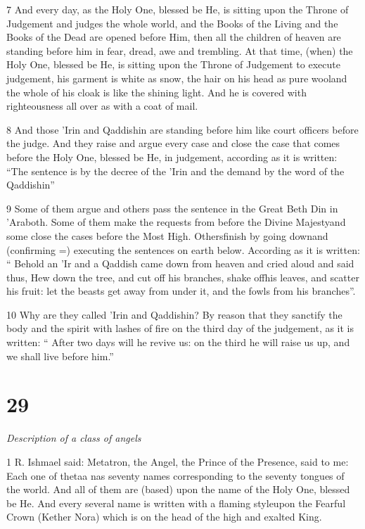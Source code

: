 \par 7 And every day, as the Holy One, blessed be He, is sitting upon the Throne of Judgement and judges the whole world, and the Books of the Living and the Books of the Dead are opened before Him, then all the children of heaven are standing before him in fear, dread, awe and trembling. At that time, (when) the Holy One, blessed be He, is sitting upon the Throne of Judgement to execute judgement, his garment is white as snow, the hair on his head as pure wooland the whole of his cloak is like the shining light. And he is covered with righteousness all over as with a coat of mail. 

\par 8 And those 'Irin and Qaddishin are standing before him like court officers before the judge. And they raise and argue every case and close the case that comes before the Holy One, blessed be He, in judgement, according as it is written: “The sentence is by the decree of the 'Irin and the demand by the word of the Qaddishin”

\par 9 Some of them argue and others pass the sentence in the Great Beth Din in 'Araboth. Some of them make the requests from before the Divine Majestyand some close the cases before the Most High. Othersfinish by going downand (confirming =) executing the sentences on earth below. According as it is written: “ Behold an 'Ir and a Qaddish came down from heaven and cried aloud and said thus, Hew down the tree, and cut off his branches, shake offhis leaves, and scatter his fruit: let the beasts get away from under it, and the fowls from his branches”. 

\par 10 Why are they called 'Irin and Qaddishin? By reason that they sanctify the body and the spirit with lashes of fire on the third day of the judgement, as it is written: “ After two days will he revive us: on the third he will raise us up, and we shall live before him.” 

\chapter{29}

\par \textit{Description of a class of angels}

\par 1 R. Ishmael said: Metatron, the Angel, the Prince of the Presence, said to me: Each one of thetaa nas seventy names corresponding to the seventy tongues of the world. And all of them are (based) upon the name of the Holy One, blessed be He. And every several name is written with a flaming styleupon the Fearful Crown (Kether Nora) which is on the head of the high and exalted King. 

